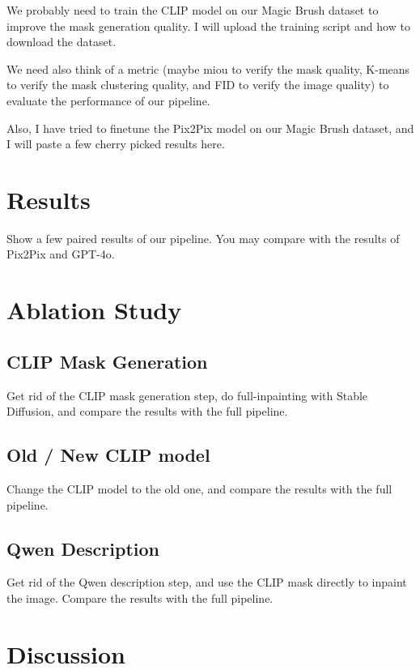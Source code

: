 \documentclass{article}
\begin{document}
We probably need to train the CLIP model on our Magic Brush dataset to improve the mask generation quality. I will upload the training script and how to download the dataset.


We need also think of a metric (maybe miou to verify the mask quality, K-means to verify the mask clustering quality, and FID to verify the image quality) to evaluate the performance of our pipeline.


Also, I have tried to finetune the Pix2Pix model on our Magic Brush dataset, and I will paste a few cherry picked results here.


\section{Results}


Show a few paired results of our pipeline. You may compare with the results of Pix2Pix and GPT-4o.


\section{Ablation Study}


\subsection{CLIP Mask Generation}


Get rid of the CLIP mask generation step, do full-inpainting with Stable Diffusion, and compare the results with the full pipeline.


\subsection{Old / New CLIP model}


Change the CLIP model to the old one, and compare the results with the full pipeline.


\subsection{Qwen Description}


Get rid of the Qwen description step, and use the CLIP mask directly to inpaint the image. Compare the results with the full pipeline.


\section{Discussion}
\end{document}
